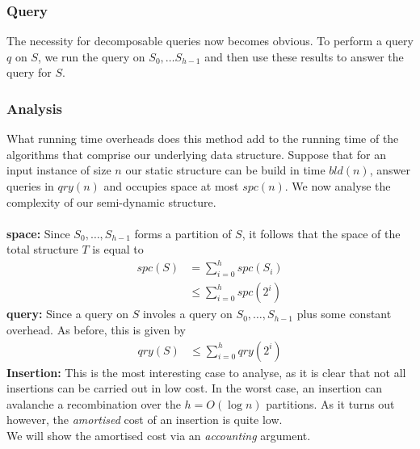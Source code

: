 \documentclass{article}
\begin{document}
\subsubsection*{Query}

The necessity for decomposable queries now becomes obvious. To perform a query $q$ on $S$, we run the query on $S_0, \dots S_{h-1}$ and then use these results to answer the query for $S$.

\subsubsection*{Analysis}

What running time overheads does this method add to the running time of the algorithms that comprise our underlying data structure. Suppose that for an input instance of size $n$ our static structure can be build in time $bld(n)$, answer queries in $qry(n)$ and occupies space at most $spc(n)$. We now analyse the complexity of our semi-dynamic structure. \\
\\
\textbf{space:} Since $S_0,\dots,S_{h-1}$ forms a partition of $S$, it follows that the space of the total structure $T$ is equal to 
\begin{align*}
    spc(S) &= \sum_{i=0}^{h} spc(S_i) \\
    &\leq \sum_{i=0}^{h} spc(2^i)
\end{align*}
\textbf{query:} Since a query on $S$ involes a query on $S_0, \dots, S_{h-1}$ plus some constant overhead. As before, this is given by 
\begin{align*}
    qry(S) &\leq \sum_{i=0}^{h}qry(2^i) 
\end{align*}
\textbf{Insertion:} This is the most interesting case to analyse, as it is clear that not all insertions can be carried out in low cost. In the worst case, an insertion can avalanche a recombination over the $h = O(\log n)$ partitions. As it turns out however, the \textit{amortised} cost of an insertion is quite low. \\
We will show the amortised cost via an \textit{accounting} argument.

\newpage

\end{document}
